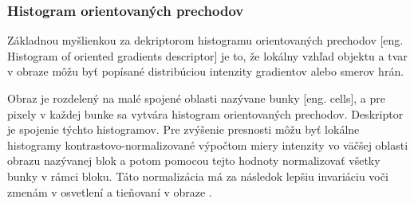 \subsubsection{Histogram orientovaných prechodov}
Základnou myšlienkou za dekriptorom histogramu orientovaných prechodov [eng. Histogram of oriented gradients descriptor] je to, že lokálny vzhľad objektu a tvar v obraze môžu byť popísané
	distribúciou intenzity gradientov alebo smerov hrán.

Obraz je rozdelený na malé spojené oblasti nazývane bunky [eng. cells], a pre pixely v každej bunke sa vytvára histogram orientovaných prechodov.
Deskriptor je spojenie týchto histogramov.
Pre zvýšenie presnosti môžu byť lokálne histogramy kontrastovo-normalizované výpočtom miery intenzity vo väčšej oblasti obrazu nazývanej blok a potom
	pomocou tejto hodnoty normalizovať všetky bunky v rámci bloku.
Táto normalizácia má za následok lepšiu invariáciu voči zmenám v osvetlení a tieňovaní v obraze \cite{prop:HOG}.

\begin{comment}
	\subsubsection{Priemerna štandartná odchylka vstupných údajov}
	Je užitočné vytvoriť si tzv. ''stredný obraz'' získaný priemernými hodnotami pre každý pixel zo všetkých trénovacích dát.
	Timto spôsobom je možné vytvoriť si základny prehľad o štruktúre vstupných dát.
	Na základe toho môžeme potom do vstupným dát pridať rôzne dalšie variácie klasifikovaných objektov pre lepšie generalizovanie klasifikátora \cite{odkaz:NNPreprocessing}.
\end{comment}
